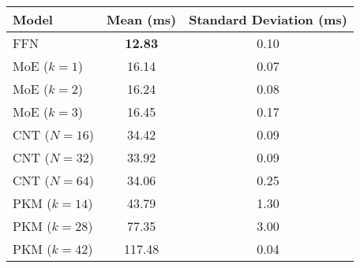 \begin{tabular}{lcc}
\toprule
Model & Mean (ms) & Standard Deviation (ms) \\
\midrule
FFN & \textbf{12.83} & 0.10 \\
MoE ($k=1$) & 16.14 & 0.07 \\
MoE ($k=2$) & 16.24 & 0.08 \\
MoE ($k=3$) & 16.45 & 0.17 \\
CNT ($N=16$) & 34.42 & 0.09 \\
CNT ($N=32$) & 33.92 & 0.09 \\
CNT ($N=64$) & 34.06 & 0.25 \\
PKM ($k=14$) & 43.79 & 1.30 \\
PKM ($k=28$) & 77.35 & 3.00 \\
PKM ($k=42$) & 117.48 & 0.04 \\
\bottomrule
\end{tabular}